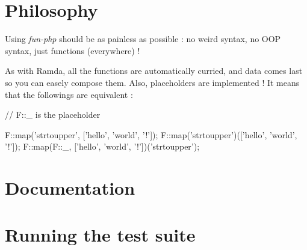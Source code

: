 \section*{Philosophy}

Using {\itshape fun-\/php} should be as painless as possible \+: no weird syntax, no O\+OP syntax, just functions (everywhere) !

As with Ramda, all the functions are automatically curried, and data comes last so you can easely compose them. Also, placeholders are implemented ! It means that the followings are equivalent \+:


\begin{DoxyCode}
// F::\_ is the placeholder

F::map('strtoupper', ['hello', 'world', '!']);
F::map('strtoupper')(['hello', 'world', '!']);
F::map(F::\_, ['hello', 'world', '!'])('strtoupper');
\end{DoxyCode}


\section*{Documentation}

\section*{Running the test suite}